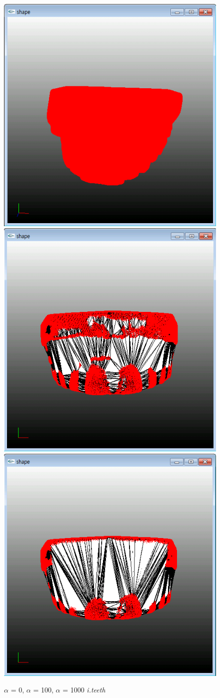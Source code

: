 \documentclass[11pt]{article}
\begin{document}
\begin{figure}[ht]
\includegraphics[width=.5\textwidth]{FIGS/alpha0-iteeth}
\hspace{1cm}
\includegraphics[width=.5\textwidth]{FIGS/alpha100-iteeth}
\vspace{1cm}
\includegraphics[width=.5\textwidth]{FIGS/alpha1000-iteeth}
\caption{$\alpha$ = 0, $\alpha$ = 100, $\alpha$ = 1000 \textit{i.teeth}}
\end{figure}
\end{document}
